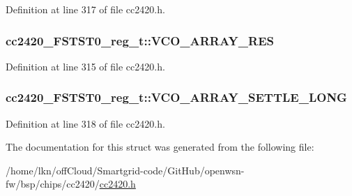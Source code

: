 Definition at line 317 of file cc2420.\+h.

\subsubsection[{\texorpdfstring{V\+C\+O\+\_\+\+A\+R\+R\+A\+Y\+\_\+\+R\+ES}{VCO_ARRAY_RES}}]{ cc2420\+\_\+\+F\+S\+T\+S\+T0\+\_\+reg\+\_\+t\+::\+V\+C\+O\+\_\+\+A\+R\+R\+A\+Y\+\_\+\+R\+ES}\hypertarget{structcc2420___f_s_t_s_t0__reg__t_a8eece237a1b041204026f039a0f1af67}{}\label{structcc2420___f_s_t_s_t0__reg__t_a8eece237a1b041204026f039a0f1af67}


Definition at line 315 of file cc2420.\+h.

\subsubsection[{\texorpdfstring{V\+C\+O\+\_\+\+A\+R\+R\+A\+Y\+\_\+\+S\+E\+T\+T\+L\+E\+\_\+\+L\+O\+NG}{VCO_ARRAY_SETTLE_LONG}}]{ cc2420\+\_\+\+F\+S\+T\+S\+T0\+\_\+reg\+\_\+t\+::\+V\+C\+O\+\_\+\+A\+R\+R\+A\+Y\+\_\+\+S\+E\+T\+T\+L\+E\+\_\+\+L\+O\+NG}\hypertarget{structcc2420___f_s_t_s_t0__reg__t_ac264f08517533ef185f044e72322acb7}{}\label{structcc2420___f_s_t_s_t0__reg__t_ac264f08517533ef185f044e72322acb7}


Definition at line 318 of file cc2420.\+h.



The documentation for this struct was generated from the following file\+:\begin{DoxyCompactItemize}
\item 
/home/lkn/off\+Cloud/\+Smartgrid-\/code/\+Git\+Hub/openwsn-\/fw/bsp/chips/cc2420/\hyperlink{cc2420_8h}{cc2420.\+h}\end{DoxyCompactItemize}
